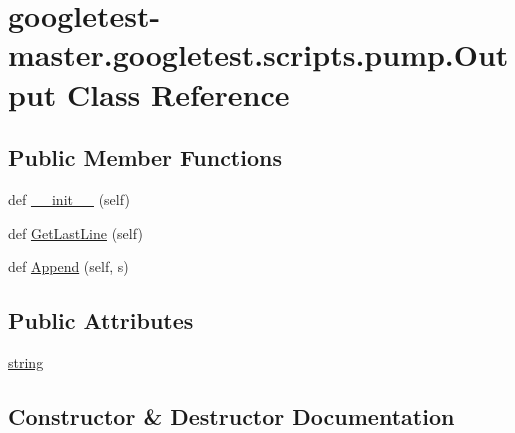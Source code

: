 \hypertarget{classgoogletest-master_1_1googletest_1_1scripts_1_1pump_1_1_output}{}\section{googletest-\/master.googletest.\+scripts.\+pump.\+Output Class Reference}
\label{classgoogletest-master_1_1googletest_1_1scripts_1_1pump_1_1_output}
\subsection*{Public Member Functions}
\begin{DoxyCompactItemize}
\item 
def \mbox{\hyperlink{classgoogletest-master_1_1googletest_1_1scripts_1_1pump_1_1_output_adf1cfc6370d491909eade7211472d716}{\+\_\+\+\_\+init\+\_\+\+\_\+}} (self)
\item 
def \mbox{\hyperlink{classgoogletest-master_1_1googletest_1_1scripts_1_1pump_1_1_output_a9a4c4755bfc94aae78bbb8376e6feae1}{Get\+Last\+Line}} (self)
\item 
def \mbox{\hyperlink{classgoogletest-master_1_1googletest_1_1scripts_1_1pump_1_1_output_aa9e2c3168ce327c9e73b22ebc9f27610}{Append}} (self, s)
\end{DoxyCompactItemize}
\subsection*{Public Attributes}
\begin{DoxyCompactItemize}
\item 
\mbox{\hyperlink{classgoogletest-master_1_1googletest_1_1scripts_1_1pump_1_1_output_af0a3e3af02acadd710055b9a238b2898}{string}}
\end{DoxyCompactItemize}


\subsection{Constructor \& Destructor Documentation}
\mbox{\label{classgoogletest-master_1_1googletest_1_1scripts_1_1pump_1_1_output_adf1cfc6370d491909eade7211472d716}} 
